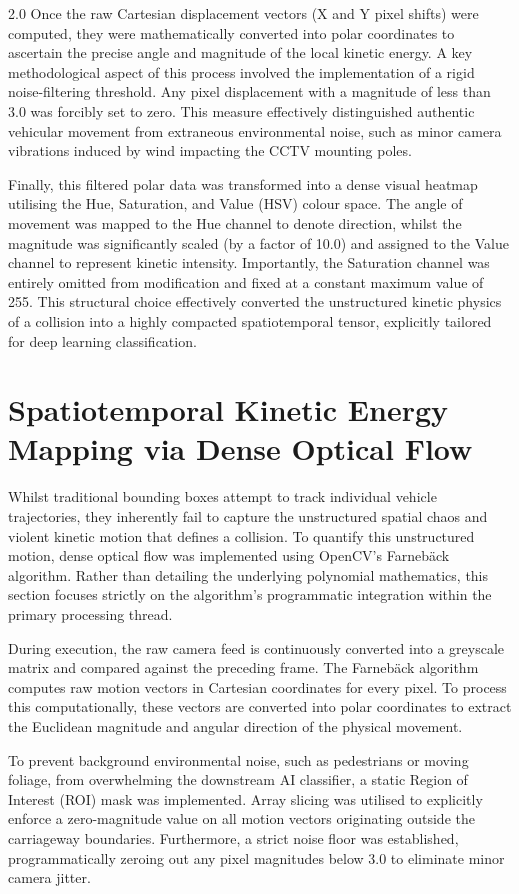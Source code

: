 \begin{spacing}{2.0}
Once the raw Cartesian displacement vectors (X and Y pixel shifts) were computed, they were mathematically converted into polar coordinates to ascertain the precise angle and magnitude of the local kinetic energy. A key methodological aspect of this process involved the implementation of a rigid noise-filtering threshold. Any pixel displacement with a magnitude of less than 3.0 was forcibly set to zero. This measure effectively distinguished authentic vehicular movement from extraneous environmental noise, such as minor camera vibrations induced by wind impacting the CCTV mounting poles.

Finally, this filtered polar data was transformed into a dense visual heatmap utilising the Hue, Saturation, and Value (HSV) colour space. The angle of movement was mapped to the Hue channel to denote direction, whilst the magnitude was significantly scaled (by a factor of 10.0) and assigned to the Value channel to represent kinetic intensity. Importantly, the Saturation channel was entirely omitted from modification and fixed at a constant maximum value of 255. This structural choice effectively converted the unstructured kinetic physics of a collision into a highly compacted spatiotemporal tensor, explicitly tailored for deep learning classification.

\section{Spatiotemporal Kinetic Energy Mapping via Dense Optical Flow}
Whilst traditional bounding boxes attempt to track individual vehicle trajectories, they inherently fail to capture the unstructured spatial chaos and violent kinetic motion that defines a collision. To quantify this unstructured motion, dense optical flow was implemented using OpenCV's Farnebäck algorithm. Rather than detailing the underlying polynomial mathematics, this section focuses strictly on the algorithm's programmatic integration within the primary processing thread.

During execution, the raw camera feed is continuously converted into a greyscale matrix and compared against the preceding frame. The Farnebäck algorithm computes raw motion vectors in Cartesian coordinates for every pixel. To process this computationally, these vectors are converted into polar coordinates to extract the Euclidean magnitude and angular direction of the physical movement.

To prevent background environmental noise, such as pedestrians or moving foliage, from overwhelming the downstream AI classifier, a static Region of Interest (ROI) mask was implemented. Array slicing was utilised to explicitly enforce a zero-magnitude value on all motion vectors originating outside the carriageway boundaries. Furthermore, a strict noise floor was established, programmatically zeroing out any pixel magnitudes below 3.0 to eliminate minor camera jitter.


\end{spacing}
